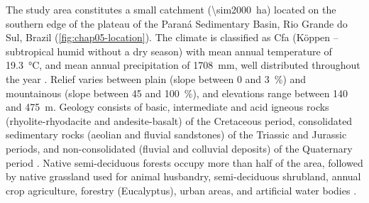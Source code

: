 The study area constitutes a small catchment (\SI{\sim2000}{\hectare}) located on the southern edge of the 
plateau of the Paraná Sedimentary Basin, Rio Grande do Sul, Brazil (\autoref{fig:chap05-location}). The climate 
is classified as Cfa (K\"oppen -- subtropical humid without a dry season) with mean annual temperature of 
\SI{19.3}{\celsius}, and mean annual precipitation of \SI{1708}{\mm}, well distributed throughout the year 
\cite{Maluf2000}. Relief varies between plain (slope between \num{0} and \SI{3}{\percent}) and mountainous 
(slope between \num{45} and \SI{100}{\percent}), and elevations range between \num{140} and \SI{475}{\m}. 
Geology consists of basic, intermediate and acid igneous rocks (rhyolite-rhyodacite and andesite-basalt) of the 
Cretaceous period, consolidated sedimentary rocks (aeolian and fluvial sandstones) of the Triassic and Jurassic 
periods, and non-consolidated (fluvial and colluvial deposits) of the Quaternary period 
\cite{GasparettoEtAl1988, MacielFilho1990, Sartori2009}. Native semi-deciduous forests occupy more than 
half of the area, followed by native grassland used for animal husbandry, semi-deciduous shrubland, annual 
crop agriculture, forestry (Eucalyptus), urban areas, and artificial water bodies \cite{SamuelRosaEtAl2011a}.


